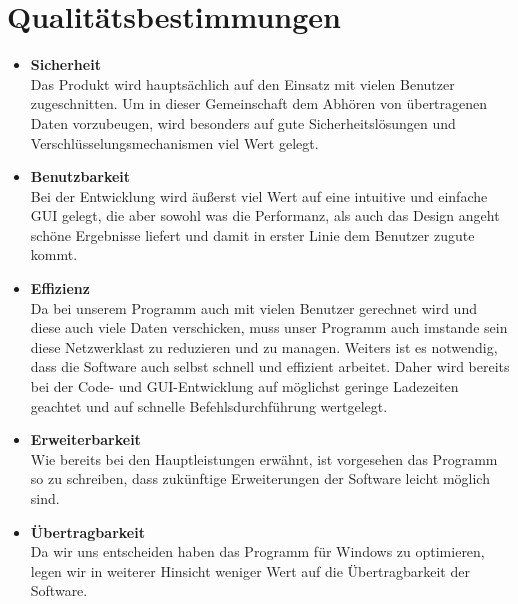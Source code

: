 \documentclass[a4paper,12pt]{scrreprt}
\begin{document}
\chapter{Qualitätsbestimmungen}
\begin{itemize}
	\item {\LARGE\textbf{Sicherheit}}\\
	Das Produkt wird hauptsächlich auf den Einsatz mit vielen Benutzer zugeschnitten. Um in dieser Gemeinschaft dem Abhören von übertragenen Daten vorzubeugen, wird besonders auf gute Sicherheitslösungen und Verschlüsselungsmechanismen viel Wert gelegt.
	\item {\LARGE\textbf{Benutzbarkeit}}\\
	Bei der Entwicklung wird äußerst viel Wert auf eine intuitive und einfache GUI gelegt, die aber sowohl was die Performanz, als auch das Design angeht schöne Ergebnisse liefert und damit in erster Linie dem Benutzer zugute kommt.
	\item {\LARGE\textbf{Effizienz}}\\
	Da bei unserem Programm auch mit vielen Benutzer gerechnet wird und diese auch viele Daten verschicken, muss unser Programm auch imstande sein diese Netzwerklast zu reduzieren und zu managen. Weiters ist es notwendig, dass die Software auch selbst schnell und effizient arbeitet. Daher wird bereits bei der Code- und GUI-Entwicklung auf möglichst geringe Ladezeiten geachtet und auf schnelle Befehlsdurchführung wertgelegt.
	\item {\LARGE\textbf{Erweiterbarkeit}}\\
	Wie bereits bei den Hauptleistungen erwähnt, ist vorgesehen das Programm so zu schreiben, dass zukünftige Erweiterungen der Software leicht möglich sind.
	\item {\LARGE\textbf{Übertragbarkeit}}	\\
	Da wir uns entscheiden haben das Programm für Windows zu optimieren, legen wir in weiterer Hinsicht weniger Wert auf die Übertragbarkeit der Software.
	\end{itemize}
\end{document}
